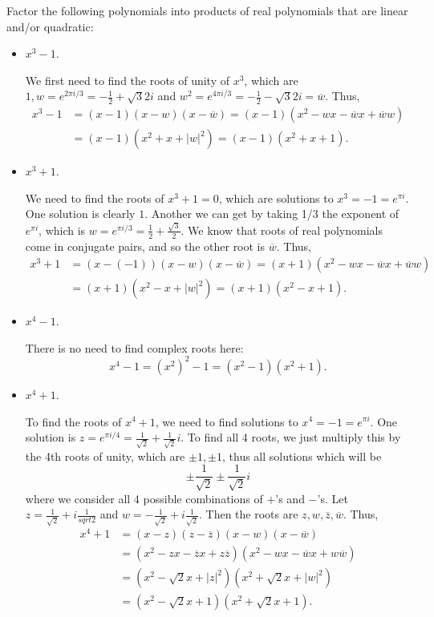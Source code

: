 \documentclass[11pt,dvipsnames]{book}
\numberwithin{figure}{section} %
\numberwithin{table}{section} %
\begin{document}
\begin{exercise} Factor the following polynomials into products of real polynomials that are linear and/or quadratic:

\begin{itemize}
\item $x^3-1$.
\begin{solution}
We first need to find the roots of unity of $x^3$, which are $1, w=e^{2\pi i/3}=-\frac{1}{2}+\sqrt{3}{2}i$ and $w^2=e^{4\pi i/3} = -\frac{1}{2}-\sqrt{3}{2}i=\overline{w}$.  Thus,
\begin{align*}
x^3-1 & = (x-1)(x-w)(x-\overline{w}) = (x-1)(x^2-wx-\overline{w}x+\overline{w}w) \\
& = (x-1)(x^2+x+|w|^2) = (x-1)(x^2+x+1).
\end{align*}
\end{solution}
\item $x^3+1$.

\begin{solution}
We need to find the roots of $x^3+1=0$, which are solutions to $x^3=-1=e^{\pi i}$. One solution is clearly $1$. Another we can get by taking 1/3 the exponent of $e^{\pi i}$, which is $w=e^{\pi i/3} = \frac{1}{2}+\frac{\sqrt{3}}{2}$. We know that roots of real polynomials come in conjugate pairs, and so the other root is $\overline{w}$. Thus,
\begin{align*}
x^3+1 & = (x-(-1))(x-w)(x-\overline{w}) = (x+1)(x^2-wx-\overline{w}x+\overline{w}w) \\
& = (x+1)(x^2-x+|w|^2) = (x+1)(x^2-x+1).
\end{align*}
\end{solution}

\item $x^4-1$.

\begin{solution}
There is no need to find complex roots here:
\[
x^4-1 = (x^2)^2-1 = (x^2-1)(x^2+1).
\]
\end{solution}

\item $x^4+1$.

\begin{solution}
To find the roots of $x^4+1$, we need to find solutions to $x^4=-1=e^{\pi i}$. One solution is $z=e^{\pi i/4}=\frac{1}{\sqrt{2}}+\frac{1}{\sqrt{2}}i$. To find all 4 roots, we just multiply this by the 4th roots of unity, which are $\pm 1, \pm 1$, thus all solutions which will be
\[
\pm \frac{1}{\sqrt{2}} \pm \frac{1}{\sqrt{2}}i
\]
where we consider all 4 possible combinations of $+$'s and $-$'s. Let $z=\frac{1}{\sqrt{2}}+i\frac{1}{sqrt{2}}$ and $w=-\frac{1}{\sqrt{2}}+i\frac{1}{\sqrt{2}}$. Then the roots are $z,w,\overline{z},\overline{w}$. Thus,
\begin{align*}
x^4+1 &
= (x-z)(z-\overline{z})(x-w)(x-\overline{w})\\
& =(x^2 -zx-\overline{z}x+z\overline{z})(x^2 -wx-\overline{w}x+w\overline{w})\\
& = (x^2-\sqrt{2}x+|z|^2)(x^2+\sqrt{2}x+|w|^2)\\
& = (x^2-\sqrt{2}x+1)(x^2+\sqrt{2}x+1).
\end{align*}
\end{solution}


\end{itemize}
\end{exercise}
\end{document}
